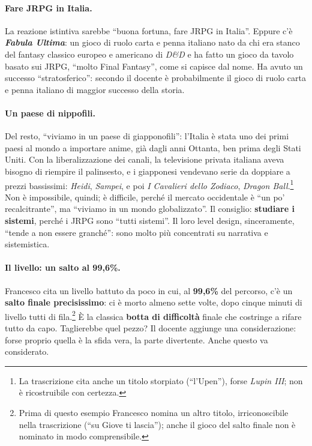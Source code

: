 \paragraph{Fare JRPG in Italia.} La reazione istintiva sarebbe ``buona
fortuna, fare JRPG in Italia''. Eppure c'è \textbf{\emph{Fabula Ultima}}: un
gioco di ruolo carta e penna italiano nato da chi era stanco del fantasy
classico europeo e americano di \emph{D\&D} e ha fatto un gioco da tavolo
basato sui JRPG, ``molto Final Fantasy'', come si capisce dal nome. Ha avuto
un successo ``stratosferico'': secondo il docente è probabilmente il gioco di
ruolo carta e penna italiano di maggior successo della storia.

\paragraph{Un paese di nippofili.} Del resto, ``viviamo in un paese di
giapponofili'': l'Italia è stata uno dei primi paesi al mondo a importare
anime, già dagli anni Ottanta, ben prima degli Stati Uniti. Con la
liberalizzazione dei canali, la televisione privata italiana aveva bisogno di
riempire il palinsesto, e i giapponesi vendevano serie da doppiare a prezzi
bassissimi: \emph{Heidi}, \emph{Sampei}, e poi \emph{I Cavalieri dello
Zodiaco}, \emph{Dragon Ball}.\footnote{La trascrizione cita anche un titolo
storpiato (``l'Upen''), forse \emph{Lupin III}; non è ricostruibile con
certezza.} Non è impossibile, quindi; è difficile, perché il mercato
occidentale è ``un po' recalcitrante'', ma ``viviamo in un mondo
globalizzato''. Il consiglio: \textbf{studiare i sistemi}, perché i JRPG sono
``tutti sistemi''. Il loro level design, sinceramente, ``tende a non essere
granché'': sono molto più concentrati su narrativa e sistemistica.

\paragraph{Il livello: un salto al 99,6\%.} Francesco cita un livello battuto
da poco in cui, al \textbf{99,6\%} del percorso, c'è un \textbf{salto finale
precisissimo}: ci è morto almeno sette volte, dopo cinque minuti di livello
tutti di fila.\footnote{Prima di questo esempio Francesco nomina un altro
titolo, irriconoscibile nella trascrizione (``su Giove ti lascia''); anche il
gioco del salto finale non è nominato in modo comprensibile.} È la classica
\textbf{botta di difficoltà} finale che costringe a rifare tutto da capo.
Taglierebbe quel pezzo? Il docente aggiunge una considerazione: forse proprio
quella è la sfida vera, la parte divertente. Anche questo va considerato.

